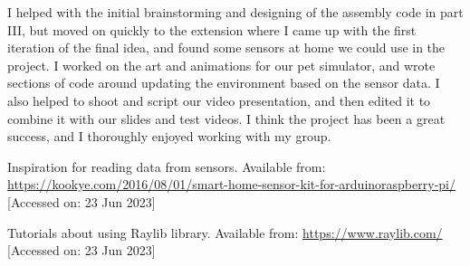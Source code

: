 \documentclass[11pt, oneside, UKenglish]{article}
\begin{document}
I helped with the initial brainstorming and designing of the assembly code in part III, but moved on quickly to the extension where I came up with the first iteration of the final idea, and found some sensors at home we could use in the project.
I worked on the art and animations for our pet simulator, and wrote sections of code around updating the environment based on the sensor data.
I also helped to shoot and script our video presentation, and then edited it to combine it with our slides and test videos.
I think the project has been a great success, and I thoroughly enjoyed working with my group.

\begin{thebibliography}{2}
Inspiration for reading data from sensors. Available from: \url{https://kookye.com/2016/08/01/smart-home-sensor-kit-for-arduinoraspberry-pi/} [Accessed on: 23 Jun 2023]

Tutorials about using Raylib library. Available from: \url{https://www.raylib.com/} [Accessed on: 23 Jun 2023]
\end{thebibliography}
\end{document}
